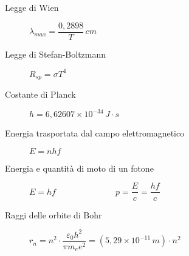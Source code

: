 \documentclass[a4paper,11pt,italian]{article}
\begin{document}
\begin{description}
  \item[Legge di Wien] 
  $ \lambda_{max} = \dfrac{0,2898}{T} \, cm $
  
  \item[Legge di Stefan-Boltzmann] 
  $ R_{sp} = \sigma T^4 $
  
  \item[Costante di Planck]
  $ h = 6,62607 \times 10^{-34} \, J\cdot s $
  
  \item[Energia trasportata dal campo elettromagnetico]
  $ E=nhf $
  
  \item[Energia e quantità di moto di un fotone] $ E=hf $~~~~~~~~~~~~~~$ p = \dfrac{E}{c} = \dfrac{hf}{c} $
  
  
%   
%   
%   
  \item[Raggi delle orbite di Bohr]
  $ r_n = n^2 \cdot \dfrac{\varepsilon_0 h^2}{\pi m_e e^2} = (5,29 \times 10^{-11} \, m)\cdot n^2 $
  

\end{description}
\end{document}
